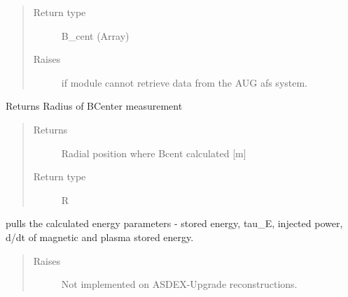 \documentclass[letterpaper,10pt,english]{sphinxmanual}
\begin{document}
\begin{fulllineitems}
\begin{fulllineitems}
\begin{quote}
\begin{description}
\item[{Return type}] \leavevmode
B\_cent (Array)

\item[{Raises}] \leavevmode
{} \textendash{} if module cannot retrieve data from the AUG afs system.

\end{description}\end{quote}

\end{fulllineitems}


\begin{fulllineitems}
\label{\detokenize{eqtools:eqtools.AUGData.AUGDDData.getRCentr}}
Returns Radius of BCenter measurement
\begin{quote}\begin{description}
\item[{Returns}] \leavevmode
Radial position where Bcent calculated {[}m{]}

\item[{Return type}] \leavevmode
R

\end{description}\end{quote}

\end{fulllineitems}


\begin{fulllineitems}
\label{\detokenize{eqtools:eqtools.AUGData.AUGDDData.getEnergy}}
pulls the calculated energy parameters - stored energy, tau\_E,
injected power, d/dt of magnetic and plasma stored energy.
\begin{quote}\begin{description}
\item[{Raises}] \leavevmode
{} \textendash{} Not implemented on ASDEX-Upgrade reconstructions.

\end{description}\end{quote}


\end{fulllineitems}
\end{fulllineitems}
\end{document}
